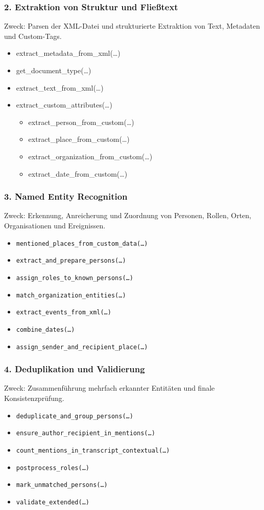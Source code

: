 \documentclass[12pt, a4paper, ngerman, bidi=default]{article}
\begin{document}
\subsubsection*{2. Extraktion von Struktur und Fließtext}
Zweck: Parsen der XML-Datei und strukturierte Extraktion von Text, Metadaten und Custom-Tags.
\begin{itemize}
\item extract\_metadata\_from\_xml(\dots)
\item get\_document\_type(\dots)
\item extract\_text\_from_xml(\dots)
\item extract\_custom\_attributes(\dots)
  \begin{itemize}
  mit:
  \item extract\_person\_from\_custom(\dots)
  \item extract\_place\_from\_custom(\dots)
  \item extract\_organization\_from\_custom(\dots)
  \item extract\_date\_from\_custom(\dots)
  \end{itemize}
\end{itemize}

\subsubsection*{3. Named Entity Recognition}
Zweck: Erkennung, Anreicherung und Zuordnung von Personen, Rollen, Orten, Organisationen und Ereignissen.
\begin{itemize}
\item \texttt{mentioned\_places\_from\_custom\_data(\dots)}
\item \texttt{extract\_and\_prepare\_persons(\dots)}
\item \texttt{assign\_roles\_to\_known\_persons(\dots)}
\item \texttt{match\_organization\_entities(\dots)}
\item \texttt{extract\_events\_from\_xml(\dots)}
\item \texttt{combine\_dates(\dots)}
\item \texttt{assign\_sender\_and\_recipient\_place(\dots)}
\end{itemize}


\subsubsection*{4. Deduplikation und Validierung}
Zweck: Zusammenführung mehrfach erkannter Entitäten und finale Konsistenzprüfung.
\begin{itemize}
\item \texttt{deduplicate\_and\_group\_persons(\dots)}
\item \texttt{ensure\_author\_recipient\_in\_mentions(\dots)}
\item \texttt{count\_mentions\_in\_transcript\_contextual(\dots)}
\item \texttt{postprocess\_roles(\dots)}
\item \texttt{mark\_unmatched\_persons(\dots)}
\item \texttt{validate\_extended(\dots)}
\end{itemize}
\end{document}

